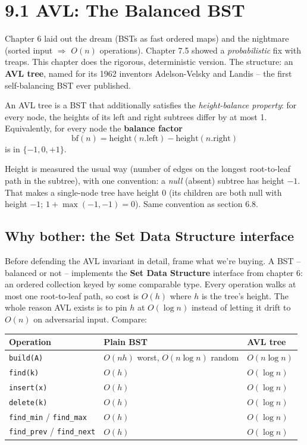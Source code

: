 \documentclass[11pt]{article}
\begin{document}
\section{9.1 AVL: The Balanced BST}

Chapter 6 laid out the dream (BSTs as fast ordered maps) and the nightmare (sorted input $\Rightarrow$ $O(n)$ operations). Chapter 7.5 showed a \emph{probabilistic} fix with treaps. This chapter does the rigorous, deterministic version. The structure: an \textbf{AVL tree}, named for its 1962 inventors Adelson-Velsky and Landis -- the first self-balancing BST ever published.

\begin{defnbox}
An AVL tree is a BST that additionally satisfies the \emph{height-balance property}: for every node, the heights of its left and right subtrees differ by at most 1. Equivalently, for every node the \textbf{balance factor} \[\text{bf}(n) = \text{height}(n.\text{left}) - \text{height}(n.\text{right})\] is in $\{-1, 0, +1\}$.
\end{defnbox}

Height is measured the usual way (number of edges on the longest root-to-leaf path in the subtree), with one convention: a \emph{null} (absent) subtree has height $-1$. That makes a single-node tree have height $0$ (its children are both null with height $-1$; $1 + \max(-1, -1) = 0$). Same convention as section 6.8.

\subsection*{Why bother: the Set Data Structure interface}

Before defending the AVL invariant in detail, frame what we're
buying. A BST -- balanced or not -- implements the
\textbf{Set Data Structure} interface from chapter 6: an ordered
collection keyed by some comparable type. Every operation walks at
most one root-to-leaf path, so cost is $O(h)$ where $h$ is the
tree's height. The whole reason AVL exists is to pin $h$ at
$O(\log n)$ instead of letting it drift to $O(n)$ on adversarial
input. Compare:

\begin{center}
\begin{tabular}{lll}
Operation                & Plain BST    & AVL tree \\
\hline
\texttt{build(A)}        & $O(n h)$ worst, $O(n \log n)$ random & $O(n \log n)$ \\
\texttt{find(k)}         & $O(h)$       & $O(\log n)$ \\
\texttt{insert(x)}       & $O(h)$       & $O(\log n)$ \\
\texttt{delete(k)}       & $O(h)$       & $O(\log n)$ \\
\texttt{find\_min} / \texttt{find\_max} & $O(h)$ & $O(\log n)$ \\
\texttt{find\_prev} / \texttt{find\_next} & $O(h)$ & $O(\log n)$ \\
\end{tabular}
\end{center}
\end{document}
